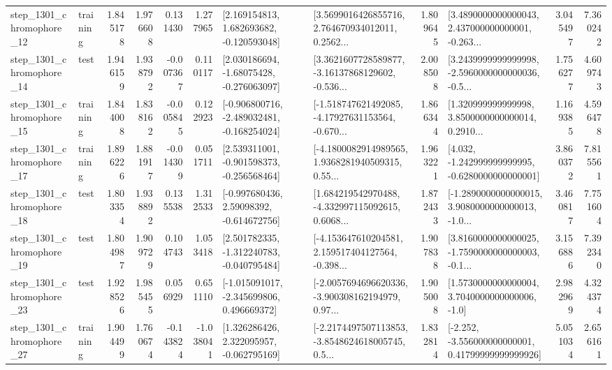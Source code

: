 \begin{tabular}{llrrrrllrlrr}
 step\_1301\_chromophore\_12 &  training &      1.845178 &    1.976608 &      0.131430 &  1.277965 &    [2.169154813, 1.682693682, -0.120593048] &  [3.5699016426855716, 2.764670934012011, 0.2562... &       1.809645 &  [3.4890000000000043, 2.437000000000001, -0.263... &            3.045497 &          7.360242 \\
 step\_1301\_chromophore\_14 &      test &      1.946159 &    1.938792 &     -0.007367 &  0.110117 &    [2.030186694, -1.68075428, -0.276063097] &  [3.3621607728589877, -3.16137868129602, -0.536... &       2.008508 &  [3.2439999999999998, -2.5960000000000036, -0.5... &            1.756277 &          4.609743 \\
 step\_1301\_chromophore\_15 &  training &      1.844008 &    1.838162 &     -0.005845 &  0.122923 &  [-0.906800716, -2.489032481, -0.168254024] &  [-1.518747621492085, -4.17927631153564, -0.670... &       1.866344 &  [1.320999999999998, 3.8500000000000014, 0.2910... &            1.169385 &          4.596478 \\
 step\_1301\_chromophore\_17 &  training &      1.896226 &    1.881917 &     -0.014309 &  0.051711 &   [2.539311001, -0.901598373, -0.256568464] &  [-4.1800082914989565, 1.9368281940509315, 0.55... &       1.963221 &   [4.032, -1.242999999999995, -0.6280000000000001] &            3.860372 &          7.815561 \\
 step\_1301\_chromophore\_18 &      test &      1.803354 &    1.938892 &      0.135538 &  1.312533 &    [-0.997680436, 2.59098392, -0.614672756] &  [1.684219542970488, -4.332997115092615, 0.6068... &       1.872433 &  [-1.2890000000000015, 3.9080000000000013, -1.0... &            3.460817 &          7.751604 \\
 step\_1301\_chromophore\_19 &      test &      1.804987 &    1.909729 &      0.104743 &  1.053418 &   [2.501782335, -1.312240783, -0.040795484] &  [-4.153647610204581, 2.159517404127564, -0.398... &       1.907838 &  [3.8160000000000025, -1.7590000000000003, -0.1... &            3.156886 &          7.392340 \\
 step\_1301\_chromophore\_23 &      test &      1.928526 &    1.985455 &      0.056929 &  0.651110 &   [-1.015091017, -2.345699806, 0.496669372] &  [-2.0057694696620336, -3.900308162194979, 0.97... &       1.905008 &     [1.5730000000000004, 3.7040000000000006, -1.0] &            2.982969 &          4.324374 \\
 step\_1301\_chromophore\_27 &  training &      1.904499 &    1.760674 &     -0.143824 & -1.038041 &    [1.326286426, 2.322095957, -0.062795169] &  [-2.2174497507113853, -3.8548624618005745, 0.5... &       1.832814 &  [-2.252, -3.556000000000001, 0.41799999999999926] &            5.051034 &          2.656161 \\

\end{tabular}
